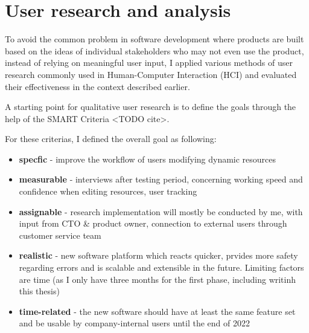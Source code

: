%
\chapter{User research and analysis}
\label{chap:research}



To avoid the common problem in software development where products are built based on the ideas of individual stakeholders who may not even use the product,
instead of relying on meaningful user input,
I applied various methods of user research commonly used in Human-Computer Interaction (HCI) and evaluated their effectiveness in the context described earlier.

A starting point for qualitative user research is to define the goals through the help of the SMART Criteria <TODO cite>.

For these criterias, I defined the overall goal as following:

\begin{itemize}
  \item \textbf{specfic} - improve the workflow of users modifying dynamic resources
  \item \textbf{measurable} - interviews after testing period, concerning working speed and confidence when editing resources, user tracking
  \item \textbf{assignable} - research implementation will mostly be conducted by me, with input from CTO \& product owner, connection to external users through customer service team
  \item \textbf{realistic} - new software platform which reacts quicker, prvides more safety regarding errors and is scalable and extensible in the future. Limiting factors are time (as I only have three months for the first phase, including writinh this thesis)
  \item \textbf{time-related} - the new software should have at least the same feature set and be usable by company-internal users until the end of 2022
\end{itemize}
